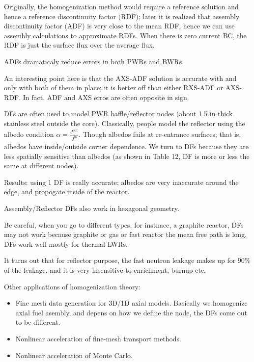 \documentclass{school-22.211-notes}
\begin{document}
Originally, the homogenization method would require a reference solution and hence a reference discontinuity factor (RDF); later it is realized that assembly discontinuity factor (ADF) is very close to the mean RDF, hence we can use assembly calculations to approximate RDFs. When there is zero current BC, the RDF is just the surface flux over the average flux. 

ADFs dramaticaly reduce errors in both PWRs and BWRs. 

An interesting point here is that the AXS-ADF solution is accurate with and only with both of them in place; it is better off than either RXS-ADF or AXS-RDF. In fact, ADF and AXS erros are often opposite in sign. 

\clearpage
{}
DFs are often used to model PWR baffle/reflector nodes (about 1.5 in thick stainless steel outside the core). Classically, people model the reflector using the albedo condition $\alpha = \frac{J_-^{\mathrm{out}}}{J_-^{\mathrm{in}}}$. Though albedos fails at re-entrance surfaces; that is, albedos have inside/outside corner dependence. We turn to DFs because they are less spatially sensitive than albedos (as shown in Table 12, DF is more or less the same at different nodes). 

Results: using 1 DF is really accurate; albedos are very inaccurate around the edge, and propogate inside of the reactor. 

Assembly/Reflector DFs also work in hexagonal geometry. 

Be careful, when you go to different types, for instnace, a graphite reactor, DFs may not work because graphite or gas or fast reactor the mean free path is long. DFs work well mostly for thermal LWRs. 

It turns out that for reflector purpose, the fast neutron leakage makes up for 90\% of the leakage, and it is very insensitive to enrichment, burnup etc. 

Other applications of homogenization theory: 
\begin{itemize}
\item Fine mesh data generation for 3D/1D axial models. Basically we homogenize axial fuel asembly, and depens on how we define the node, the DFs come out to be different. 
\item Nonlinear acceleration of fine-mesh transport methods. 
\item Nonlinear acceleration of Monte Carlo. 
\end{itemize}


\clearpage
{}
\end{document}
